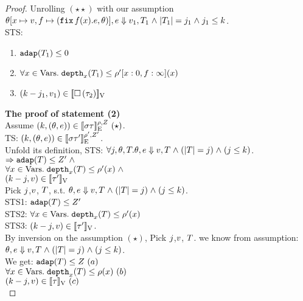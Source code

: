 \begin{proof}
Unrolling $(\star\star)$ with our assumption $ \theta[x \mapsto v, f \mapsto (\mathop{\mathtt{fix}} f(x).e,
\theta)], e \mathrel{\Downarrow} v_1, T_1 \mathrel{\wedge} |T_1| = j_1 \mathrel{\wedge}
j_1 \leq k $. \\ 
 STS:
\begin{enumerate}
\item $ \mathtt{adap}(T_1) \leq 0 $ \\    
\item $\forall x \in \mbox{Vars}.\;  \mathtt{depth}_{x}(T_1) \leq
         \rho'[x: 0, f: \infty](x)$ \\
\item $  (k - j_1,  v_1) \in [\![ \mathtt{\square} \, (\tau_2)  ]\!]_{\text{V}}$ \\
\end{enumerate}
  

\textbf{The proof of statement (2)} \\
Assume $(k, (\theta, e)) \in
 [\![ \sigma \tau ]\!]_{\text{E}}^{\rho, Z}~(\star)$. \\
%


TS: $(k, (\theta, e)) \in
 [\![ \sigma \tau' ]\!]_{\text{E}}^{\rho', Z'}$.\\
Unfold its definition, STS:
$ \forall j, \theta, T.  \theta, e \mathrel{\Downarrow} v, T \mathrel{\wedge}
(|T| = j) \mathrel{\wedge} (j \leq k) $.\\
$\Rightarrow \mathtt{adap}(T) \leq Z' \mathrel{\wedge}$\\
$\forall x \in \mbox{Vars}.\;  \mathtt{depth}_{x}(T) \leq \rho'(x)\mathrel{\wedge}$\\
$ (k - j,  v) \in [\![ \tau' ]\!]_{\text{V}}$\\
%
Pick  $j$,$v$,  $T$, s.t.
$\theta, e \mathrel{\Downarrow} v, T \mathrel{\wedge}
(|T| = j) \mathrel{\wedge} (j \leq k) $.\\
STS1: $\mathtt{adap}(T) \leq Z' $ \\
STS2: $\forall x \in \mbox{Vars}.\;  \mathtt{depth}_{x}(T) \leq
\rho'(x)$\\
STS3: $ (k - j,  v) \in [\![ \tau' ]\!]_{\text{V}}  $.\\


By inversion on the assumption $(\star)$, Pick $j$,$v$,
$T$. we know from assumption: $ \theta, e \mathrel{\Downarrow} v, T \mathrel{\wedge}
(|T| = j) \mathrel{\wedge} (j \leq k) $.\\
We get: $\mathtt{adap}(T) \leq Z ~(a)$\\
$\forall x \in \mbox{Vars}.\;  \mathtt{depth}_{x}(T) \leq \rho(x)~(b)$\\
$ (k - j,  v) \in [\![ \tau ]\!]_{\text{V}}~(c)$\\


\end{proof}
